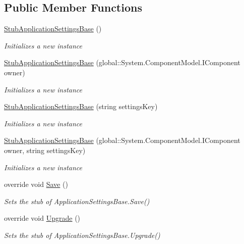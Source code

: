 \subsection*{Public Member Functions}
\begin{DoxyCompactItemize}
\item 
\hyperlink{class_system_1_1_configuration_1_1_fakes_1_1_stub_application_settings_base_a7b99f071e3b9e876566d5a2e6b7bdd61}{Stub\-Application\-Settings\-Base} ()
\begin{DoxyCompactList}\small\item\em Initializes a new instance\end{DoxyCompactList}\item 
\hyperlink{class_system_1_1_configuration_1_1_fakes_1_1_stub_application_settings_base_a6bed1c79196ef0a5fcab530ed337bc9a}{Stub\-Application\-Settings\-Base} (global\-::\-System.\-Component\-Model.\-I\-Component owner)
\begin{DoxyCompactList}\small\item\em Initializes a new instance\end{DoxyCompactList}\item 
\hyperlink{class_system_1_1_configuration_1_1_fakes_1_1_stub_application_settings_base_afdb723bbc23cc0163ea00cd853330aa4}{Stub\-Application\-Settings\-Base} (string settings\-Key)
\begin{DoxyCompactList}\small\item\em Initializes a new instance\end{DoxyCompactList}\item 
\hyperlink{class_system_1_1_configuration_1_1_fakes_1_1_stub_application_settings_base_a37ab8ebb02af3221d8e1c86064afd023}{Stub\-Application\-Settings\-Base} (global\-::\-System.\-Component\-Model.\-I\-Component owner, string settings\-Key)
\begin{DoxyCompactList}\small\item\em Initializes a new instance\end{DoxyCompactList}\item 
override void \hyperlink{class_system_1_1_configuration_1_1_fakes_1_1_stub_application_settings_base_aa88e78e024ab13ff837f06b134af2ec7}{Save} ()
\begin{DoxyCompactList}\small\item\em Sets the stub of Application\-Settings\-Base.\-Save()\end{DoxyCompactList}\item 
override void \hyperlink{class_system_1_1_configuration_1_1_fakes_1_1_stub_application_settings_base_a69b31226c21e095fe9a35703561f4974}{Upgrade} ()
\begin{DoxyCompactList}\small\item\em Sets the stub of Application\-Settings\-Base.\-Upgrade()\end{DoxyCompactList}\end{DoxyCompactItemize}
